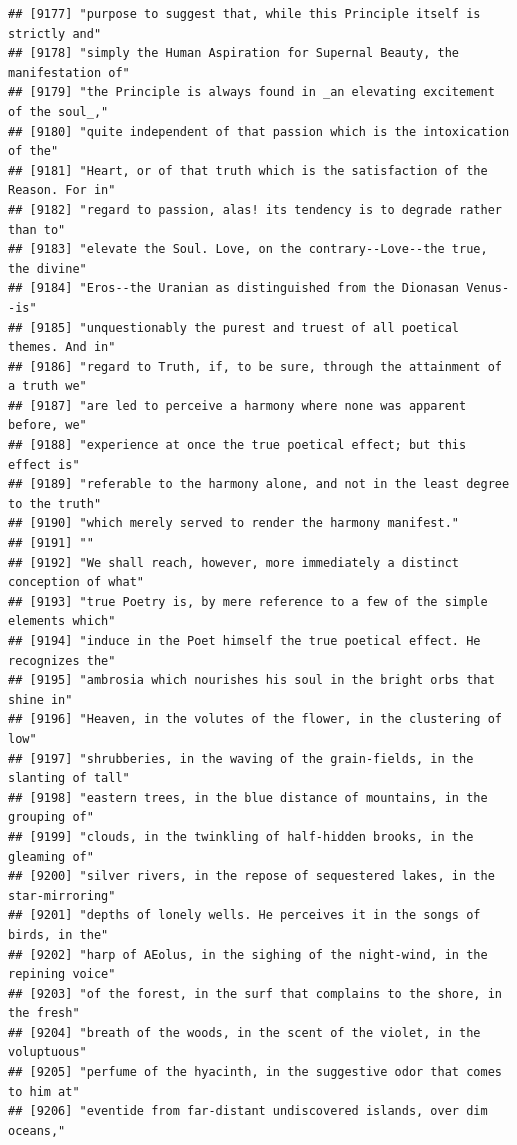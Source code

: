 \documentclass{article}\usepackage[]{graphicx}\usepackage[]{color}
\makeatletter
\newenvironment{kframe}{%
 \def\at@end@of@kframe{}%
 \ifinner\ifhmode%
  \def\at@end@of@kframe{\end{minipage}}%
  \begin{minipage}{\columnwidth}%
 \fi\fi%
 \def\FrameCommand##1{\hskip\@totalleftmargin \hskip-\fboxsep
 \colorbox{shadecolor}{##1}\hskip-\fboxsep
     \hskip-\linewidth \hskip-\@totalleftmargin \hskip\columnwidth}%
 \MakeFramed {\advance\hsize-\width
   \@totalleftmargin\z@ \linewidth\hsize
   \@setminipage}}%
 {\par\unskip\endMakeFramed%
 \at@end@of@kframe}
\newenvironment{knitrout}{}{} %
\makeatother
\begin{document}
\begin{knitrout}
\begin{kframe}
\begin{verbatim}
## [9177] "purpose to suggest that, while this Principle itself is strictly and"        
## [9178] "simply the Human Aspiration for Supernal Beauty, the manifestation of"       
## [9179] "the Principle is always found in _an elevating excitement of the soul_,"     
## [9180] "quite independent of that passion which is the intoxication of the"          
## [9181] "Heart, or of that truth which is the satisfaction of the Reason. For in"     
## [9182] "regard to passion, alas! its tendency is to degrade rather than to"          
## [9183] "elevate the Soul. Love, on the contrary--Love--the true, the divine"         
## [9184] "Eros--the Uranian as distinguished from the Dionasan Venus--is"              
## [9185] "unquestionably the purest and truest of all poetical themes. And in"         
## [9186] "regard to Truth, if, to be sure, through the attainment of a truth we"       
## [9187] "are led to perceive a harmony where none was apparent before, we"            
## [9188] "experience at once the true poetical effect; but this effect is"             
## [9189] "referable to the harmony alone, and not in the least degree to the truth"    
## [9190] "which merely served to render the harmony manifest."                         
## [9191] ""                                                                            
## [9192] "We shall reach, however, more immediately a distinct conception of what"     
## [9193] "true Poetry is, by mere reference to a few of the simple elements which"     
## [9194] "induce in the Poet himself the true poetical effect. He recognizes the"      
## [9195] "ambrosia which nourishes his soul in the bright orbs that shine in"          
## [9196] "Heaven, in the volutes of the flower, in the clustering of low"              
## [9197] "shrubberies, in the waving of the grain-fields, in the slanting of tall"     
## [9198] "eastern trees, in the blue distance of mountains, in the grouping of"        
## [9199] "clouds, in the twinkling of half-hidden brooks, in the gleaming of"          
## [9200] "silver rivers, in the repose of sequestered lakes, in the star-mirroring"    
## [9201] "depths of lonely wells. He perceives it in the songs of birds, in the"       
## [9202] "harp of AEolus, in the sighing of the night-wind, in the repining voice"     
## [9203] "of the forest, in the surf that complains to the shore, in the fresh"        
## [9204] "breath of the woods, in the scent of the violet, in the voluptuous"          
## [9205] "perfume of the hyacinth, in the suggestive odor that comes to him at"        
## [9206] "eventide from far-distant undiscovered islands, over dim oceans,"            

\end{verbatim}
\end{kframe}
\end{knitrout}
\end{document}
